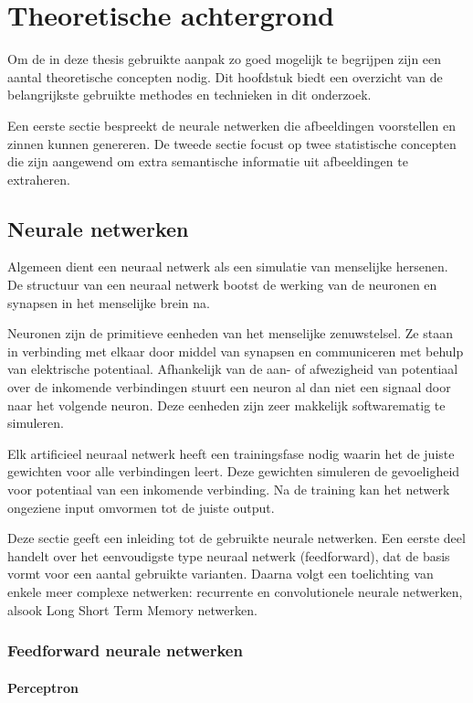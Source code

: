 \chapter{Theoretische achtergrond}
\label{hst-theorie}
Om de in deze thesis gebruikte aanpak zo goed mogelijk te begrijpen zijn een aantal theoretische concepten nodig. Dit hoofdstuk biedt een overzicht van de belangrijkste gebruikte methodes en technieken in dit onderzoek.

Een eerste sectie bespreekt de neurale netwerken die afbeeldingen voorstellen en zinnen kunnen genereren. De tweede sectie focust op twee statistische concepten die zijn aangewend om extra semantische informatie uit afbeeldingen te extraheren. 

\section{Neurale netwerken}
Algemeen dient een neuraal netwerk als een simulatie van menselijke hersenen. De structuur van een neuraal netwerk bootst de werking van de neuronen en synapsen in het menselijke brein na. 

Neuronen zijn de primitieve eenheden van het menselijke zenuwstelsel. Ze staan in verbinding met elkaar door middel van synapsen en communiceren met behulp van elektrische potentiaal. Afhankelijk van de aan- of afwezigheid van potentiaal over de inkomende verbindingen stuurt een neuron al dan niet een signaal door naar het volgende neuron. Deze eenheden zijn zeer makkelijk softwarematig te simuleren.

Elk artificieel neuraal netwerk heeft een trainingsfase nodig waarin het de juiste gewichten voor alle verbindingen leert. Deze gewichten simuleren de gevoeligheid voor potentiaal van een inkomende verbinding. Na de training kan het netwerk ongeziene input omvormen tot de juiste output.

Deze sectie geeft een inleiding tot de gebruikte neurale netwerken. Een eerste deel handelt over het eenvoudigste type neuraal netwerk (feedforward), dat de basis vormt voor een aantal gebruikte varianten. Daarna volgt een toelichting van enkele meer complexe netwerken: recurrente en convolutionele neurale netwerken, alsook Long Short Term Memory netwerken.

\subsection{Feedforward neurale netwerken}
\subsubsection{Perceptron} %
\label{par:perceptron}

